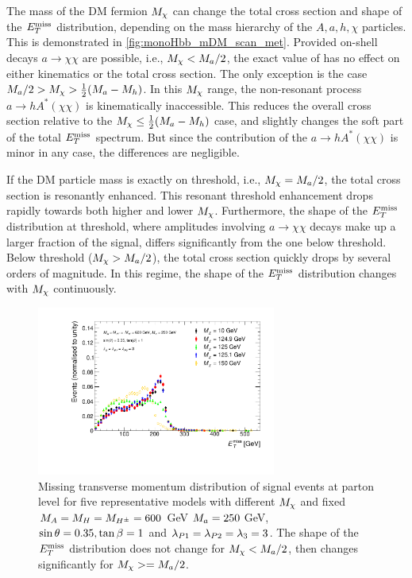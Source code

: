 
The mass of the DM fermion $\mDM$ can change the total cross section and shape of the $\MET$ distribution,
depending on the mass hierarchy of the $A,a,h,\chi$ particles. This is demonstrated in \autoref{fig:monoHbb_mDM_scan_met}. 
Provided on-shell  decays $a\to\chi\chi$ are possible, i.e., $M_{\chi} < M_{a}/2$, the exact value of \mDM has no effect on either kinematics or the total cross section. 
The only exception is the case $M_{a}/2 > M_{\chi} > \frac{1}{2}(M_{a} - M_h)$. In this  $\mDM$ range, the non-resonant process $a \to h A^*\left(\chi\chi\right) $ is kinematically inaccessible. 
This reduces the overall cross section relative to the $M_{\chi} \leq \frac{1}{2}(M_{a} - M_h)$ case, and slightly changes the soft part of the total $\MET$ spectrum. 
But since the contribution of the $a \to h A^*\left(\chi \chi\right)$ is minor in any case, the differences are negligible.

If the DM particle mass is exactly on threshold, i.e., $M_{\chi} = M_{a}/2$, the total cross section is resonantly enhanced. 
This resonant threshold enhancement drops rapidly towards both higher and lower $\mDM$. Furthermore, the shape of the $\MET$ distribution at threshold, 
where amplitudes involving $a\to\chi\chi$ decays make up a larger fraction of the signal, differs significantly from the one below threshold. Below threshold ($M_{\chi} > M_{a}/2$), the total cross section quickly drops by several orders of magnitude. In this regime, 
the shape of the $\MET$ distribution changes with $\mDM$ continuously.

\begin{figure}[tbp]
\centering
\includegraphics[width=0.7\textwidth]{texinputs/04_grid/figures/monoHbb_mDM_scan_MET_liny_norm2one.pdf}
\caption[$\MET$ distribution in \monohbb events for different $\mDM$]
{
Missing transverse momentum distribution  of \monohbb signal events at parton level for five representative models with different $\mDM$
and fixed $M_{A} = M_{H} = M_{H^{\pm}} = 600 $ GeV $M_{a} = 250$ GeV, $ \sin\theta = 0.35, \tan\beta = 1$ and $ \lambda_{P1} = \lambda_{P2} = \lambda_{3} = 3 $. 
The shape of the $\MET$ distribution does not change for $M_{\chi} < M_{a}/2$, then changes significantly for $M_{\chi}>=M_{a}/2$.
%
}
\label{fig:monoHbb_mDM_scan_met}
\end{figure}



